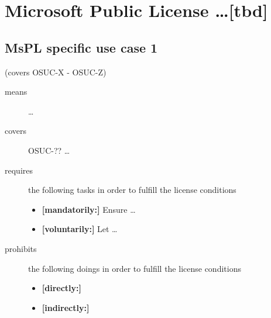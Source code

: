 %
%
%
%
%



\section{Microsoft Public License \ldots [tbd]}
\label{OSUC-01-MsPL} \label{OSUC-03-MsPL} 
\label{OSUC-06-MsPL} \label{OSUC-09-MsPL}

\label{OSUC-02-MsPL} \label{OSUC-04-MsPL} \label{OSUC-05-MsPL}
\label{OSUC-07-MsPL} \label{OSUC-08-MsPL} \label{OSUC-10-MsPL}


\subsection{MsPL specific use case 1}
(covers OSUC-X - OSUC-Z)
\begin{description}
\item[means] \ldots

\item[covers] OSUC-?? \ldots

\item[requires] the following tasks in order to fulfill the license conditions
\begin{itemize}
  \item \textbf{[mandatorily:]} Ensure \ldots
  \item \textbf{[voluntarily:]} Let \ldots
\end{itemize}

\item[prohibits] the following doings in order to fulfill the license conditions
\begin{itemize}
  \item \textbf{[directly:]} 
  \item \textbf{[indirectly:]}
\end{itemize}
\end{description}

